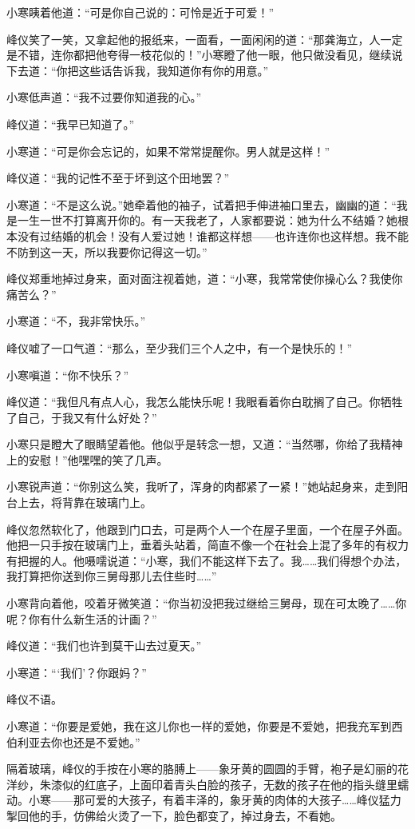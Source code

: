 \par 小寒眱着他道：“可是你自己说的：可怜是近于可爱！”
\par 峰仪笑了一笑，又拿起他的报纸来，一面看，一面闲闲的道：“那龚海立，人一定是不错，连你都把他夸得一枝花似的！”小寒瞪了他一眼，他只做没看见，继续说下去道：“你把这些话告诉我，我知道你有你的用意。”
\par 小寒低声道：“我不过要你知道我的心。”
\par 峰仪道：“我早已知道了。”
\par 小寒道：“可是你会忘记的，如果不常常提醒你。男人就是这样！”
\par 峰仪道：“我的记性不至于坏到这个田地罢？”
\par 小寒道：“不是这么说。”她牵着他的袖子，试着把手伸进袖口里去，幽幽的道：“我是一生一世不打算离开你的。有一天我老了，人家都要说：她为什么不结婚？她根本没有过结婚的机会！没有人爱过她！谁都这样想——也许连你也这样想。我不能不防到这一天，所以我要你记得这一切。”
\par 峰仪郑重地掉过身来，面对面注视着她，道：“小寒，我常常使你操心么？我使你痛苦么？”
\par 小寒道：“不，我非常快乐。”
\par 峰仪嘘了一口气道：“那么，至少我们三个人之中，有一个是快乐的！”
\par 小寒嗔道：“你不快乐？”
\par 峰仪道：“我但凡有点人心，我怎么能快乐呢！我眼看着你白耽搁了自己。你牺牲了自己，于我又有什么好处？”
\par 小寒只是瞪大了眼睛望着他。他似乎是转念一想，又道：“当然哪，你给了我精神上的安慰！”他嘿嘿的笑了几声。
\par 小寒锐声道：“你别这么笑，我听了，浑身的肉都紧了一紧！”她站起身来，走到阳台上去，将背靠在玻璃门上。
\par 峰仪忽然软化了，他跟到门口去，可是两个人一个在屋子里面，一个在屋子外面。他把一只手按在玻璃门上，垂着头站着，简直不像一个在社会上混了多年的有权力有把握的人。他嗫嚅说道：“小寒，我们不能这样下去了。我……我们得想个办法，我打算把你送到你三舅母那儿去住些时……”
\par 小寒背向着他，咬着牙微笑道：“你当初没把我过继给三舅母，现在可太晚了……你呢？你有什么新生活的计画？”
\par 峰仪道：“我们也许到莫干山去过夏天。”
\par 小寒道：“‘我们’？你跟妈？”
\par 峰仪不语。
\par 小寒道：“你要是爱她，我在这儿你也一样的爱她，你要是不爱她，把我充军到西伯利亚去你也还是不爱她。”
\par 隔着玻璃，峰仪的手按在小寒的胳膊上——象牙黄的圆圆的手臂，袍子是幻丽的花洋纱，朱漆似的红底子，上面印着青头白脸的孩子，无数的孩子在他的指头缝里蠕动。小寒——那可爱的大孩子，有着丰泽的，象牙黄的肉体的大孩子……峰仪猛力掣回他的手，仿佛给火烫了一下，脸色都变了，掉过身去，不看她。
